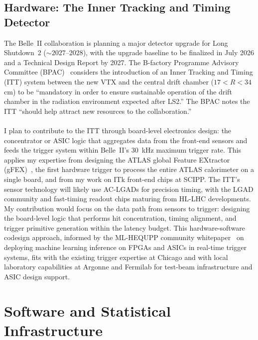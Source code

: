 \documentclass[10pt,a4paper,sans]{moderncv} %
\begin{document}
\subsection{Hardware: The Inner Tracking and Timing Detector}
The Belle~II collaboration is planning a major detector upgrade for Long Shutdown~2 ($\sim 2027$--2028), with the upgrade baseline to be finalized in July 2026 and a Technical Design Report by 2027. The B-factory Programme Advisory Committee (BPAC)~\cite{BPAC2026} considers the introduction of an Inner Tracking and Timing (ITT) system between the new VTX and the central drift chamber ($17 < R < 34$ cm) to be ``mandatory in order to ensure sustainable operation of the drift chamber in the radiation environment expected after LS2.'' The BPAC notes the ITT ``should help attract new resources to the collaboration.''
\\
\\
I plan to contribute to the ITT through board-level electronics design: the concentrator or ASIC logic that aggregates data from the front-end sensors and feeds the trigger system within Belle~II's 30~kHz maximum trigger rate. This applies my expertise from designing the ATLAS global Feature EXtractor (gFEX)~\cite{Begel:2233958,Tang:2104248}, the first hardware trigger to process the entire ATLAS calorimeter on a single board, and from my work on ITk front-end chips at SCIPP. The ITT's sensor technology will likely use AC-LGADs for precision timing, with the LGAD community and fast-timing readout chips maturing from HL-LHC developments. My contribution would focus on the data path from sensors to trigger: designing the board-level logic that performs hit concentration, timing alignment, and trigger primitive generation within the latency budget. This hardware-software codesign approach, informed by the ML-HEQUPP community whitepaper~\cite{Gonski:2026jgu} on deploying machine learning inference on FPGAs and ASICs in real-time trigger systems, fits with the existing trigger expertise at Chicago and with local laboratory capabilities at Argonne and Fermilab for test-beam infrastructure and ASIC design support.

\section{Software and Statistical Infrastructure}
\end{document}
